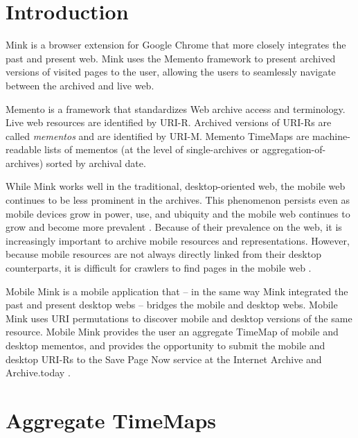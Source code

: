 \documentclass{sig-alternate-2013}
\begin{document}

\section{Introduction}
\label{introduction}
Mink \cite{mink} is a browser extension for Google Chrome that more closely integrates the past and present web. Mink uses the Memento framework \cite{nelson:memento:tr} to present archived versions of visited pages to the user, allowing the users to seamlessly navigate between the archived and live web.

Memento is a framework that standardizes Web archive access and terminology. Live web resources are identified by URI-R. Archived versions of URI-Rs are called \emph{mementos} and are identified by URI-M. Memento TimeMaps are machine-readable lists of mementos (at the level of single-archives or aggregation-of-archives) sorted by archival date.

While Mink works well in the traditional, desktop-oriented web, the mobile web continues to be less prominent in the archives. This phenomenon persists even as mobile devices grow in power, use, and ubiquity and the mobile web continues to grow and become more prevalent \cite{mobileWeb}. Because of their prevalence on the web, it is increasingly important to archive mobile resources and representations. However, because mobile resources are not always directly linked from their desktop counterparts, it is difficult for crawlers to find pages in the mobile web \cite{4544648}.

Mobile Mink is a mobile application that -- in the same way Mink integrated the past and present desktop webs -- bridges the mobile and desktop webs. Mobile Mink uses URI permutations to discover mobile and desktop versions of the same resource. Mobile Mink provides the user an aggregate TimeMap of mobile and desktop mementos, and provides the opportunity to submit the mobile and desktop URI-Rs to the Save Page Now service at the Internet Archive \cite{savePage} and Archive.today \cite{archivetoday}.


\section{Aggregate TimeMaps}
\label{timemaps}
\end{document}
